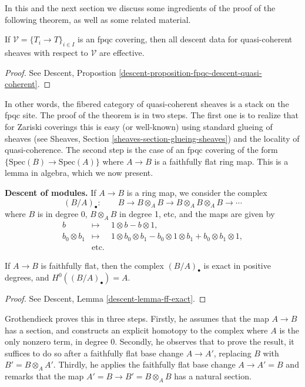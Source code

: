 \noindent
In this and the next section we discuss some ingredients of the proof
of the following theorem, as well as some related material.

\begin{theorem}
\label{theorem-descent-quasi-coherent}
If $\mathcal{V} = \{T_i \to T\}_{i\in I}$ is an fpqc covering, then all
descent data for quasi-coherent sheaves with respect to $\mathcal{V}$
are effective.
\end{theorem}

\begin{proof}
See
Descent, Propostion \ref{descent-proposition-fpqc-descent-quasi-coherent}.
\end{proof}

\noindent
In other words, the fibered category of quasi-coherent sheaves is a stack on
the fpqc site.
The proof of the theorem is in two steps. The first one is to realize that for
Zariski coverings this is easy (or well-known) using standard glueing of
sheaves (see
Sheaves, Section \ref{sheaves-section-glueing-sheaves})
and the locality of quasi-coherence. The second step is the case of an
fpqc covering of the form $\{\text{Spec}(B) \to \text{Spec}(A)\}$
where $A \to B$ is a faithfully flat ring map.
This is a lemma in algebra, which we now present.

\medskip\noindent
{\bf Descent of modules.}
If $A \to B$ is a ring map, we consider the complex
$$
(B/A)_\bullet : \qquad B \to B\otimes_A B \to B\otimes_A B \otimes_A B \to
\cdots
$$
where $B$ is in degree 0, $B\otimes_A B$ in degree 1, etc, and the maps are
given by
\begin{eqnarray*}
b & \mapsto & 1 \otimes b - b \otimes 1, \\
b_0 \otimes b_1 & \mapsto & 1 \otimes b_0 \otimes b_1 - b_0 \otimes 1 \otimes
b_1 + b_0 \otimes b_1 \otimes 1, \\
& \text{etc.}
\end{eqnarray*}

\begin{lemma}
\label{lemma-algebra-descent}
If $A \to B$ is faithfully flat, then the complex $(B/A)_\bullet$ is exact in
positive degrees, and $H^0((B/A)_\bullet) = A$.
\end{lemma}

\begin{proof}
See Descent, Lemma \ref{descent-lemma-ff-exact}.
\end{proof}

\noindent
Grothendieck proves this in three steps. Firstly, he assumes that the map $A
\to B$ has a section, and constructs an explicit homotopy to the complex where
$A$ is the only nonzero term, in degree 0. Secondly, he observes that to prove
the result, it suffices to do so after a faithfully flat base change $A \to
A'$, replacing $B$ with $B' = B \otimes_A A'$. Thirdly, he applies the
faithfully flat base change $A \to A' =B$ and remarks that the map $A' = B \to
B' = B\otimes_A B$ has a natural section.

